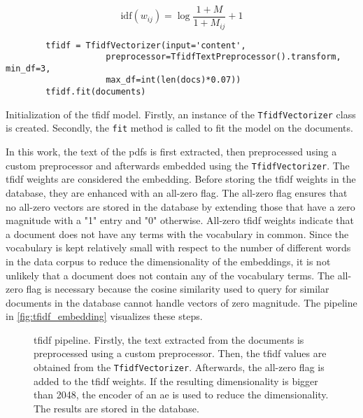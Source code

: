 \begin{equation}
    \text{idf}(w_{ij}) = \log \frac{1 + M}{1 + M_{ij}} + 1    
    \label{eq:tfidf-scikit-learn}
\end{equation}

\begin{listing}[htp]
    \begin{verbatim}
        tfidf = TfidfVectorizer(input='content', 
                    preprocessor=TfidfTextPreprocessor().transform, min_df=3, 
                    max_df=int(len(docs)*0.07))
        tfidf.fit(documents)
    \end{verbatim}
    \caption[Initialization of the \ac{tfidf} model]{Initialization of the \ac{tfidf} model.
    Firstly, an instance of the \texttt{TfidfVectorizer} class is created.
    Secondly, the \texttt{fit} method is called to fit the model on the documents.
    }
    \label{lst:impl-tfidf}
\end{listing}

In this work, the text of the \acp{pdf} is first extracted, then preprocessed using a custom preprocessor and afterwards embedded using the \texttt{TfidfVectorizer}.
The \ac{tfidf} weights are considered the embedding.
Before storing the \ac{tfidf} weights in the database, they are enhanced with an all-zero flag.
The all-zero flag ensures that no all-zero vectors are stored in the database by extending those that have a zero magnitude with a "1" entry and "0" otherwise.
All-zero \ac{tfidf} weights indicate that a document does not have any terms with the vocabulary in common.
Since the vocabulary is kept relatively small with respect to the number of different words in the data corpus to reduce the dimensionality of the embeddings, 
it is not unlikely that a document does not contain any of the vocabulary terms.
The all-zero flag is necessary because the cosine similarity used to query for similar documents in the database cannot handle vectors of zero magnitude.
The pipeline in \autoref{fig:tfidf_embedding} visualizes these steps.

\begin{figure}[!htb] %
    \centering
    
    \caption[\ac{tfidf} pipeline]{\ac{tfidf} pipeline.
    Firstly, the text extracted from the documents is preprocessed using a custom preprocessor.
    Then, the \ac{tfidf} values are obtained from the \texttt{TfidfVectorizer}.
    Afterwards, the all-zero flag is added to the \ac{tfidf} weights.
    If the resulting dimensionality is bigger than 2048, the encoder of an \ac{ae} is used to reduce the dimensionality.
    The results are stored in the database.
    }
    \label{fig:tfidf_embedding}
\end{figure}

